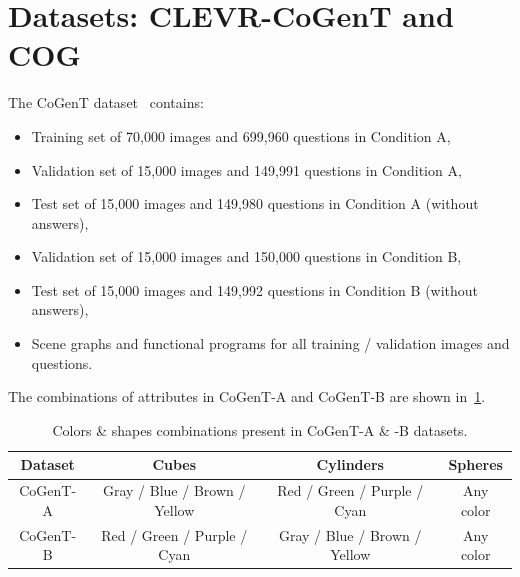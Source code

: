 \section{Datasets: CLEVR-CoGenT and COG}
\label{sec:datasets-desc}
%
The CoGenT dataset~\cite{johnson2017clevr} contains:
\begin{itemize}
	\def\labelitemi{--}
	\item Training set of 70,000 images and 699,960 questions in Condition A,
	\item Validation set of 15,000 images and 149,991 questions in Condition A,
	\item Test set of 15,000 images and 149,980 questions in Condition A (without answers),
	\item Validation set of 15,000 images and 150,000 questions in Condition B,
	\item Test set of 15,000 images and 149,992 questions in Condition B (without answers),
	\item Scene graphs and functional programs for all training / validation images and questions.
\end{itemize}

\noindent The combinations of attributes in CoGenT-A and CoGenT-B are shown in~\cref{tab:cogent_conditions_supplement}.
\begin{table}[ht]
	\centering
	\begin{tabular}{cccc}
		\toprule
		Dataset	&	Cubes	&	Cylinders	&	Spheres	\\
		\midrule
		CoGenT-A	&	Gray / Blue / Brown / Yellow	&	Red / Green / Purple / Cyan	&	Any color	\\
		CoGenT-B	&	Red / Green / Purple / Cyan	&	Gray / Blue / Brown / Yellow	&	Any color 	\\
		\bottomrule
	\end{tabular}
	\smallskip
	\caption{Colors \& shapes combinations present in CoGenT-A \& -B datasets.}
	\label{tab:cogent_conditions_supplement}
\end{table}

